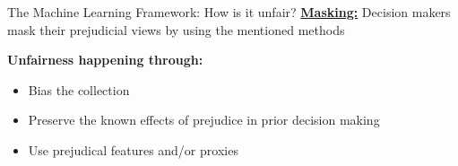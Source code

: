 \begin{frame}{The Machine Learning Framework: How is it unfair? \cite{Barocas.2016, barocas-hardt-narayanan}}
    \underline{\textbf{Masking:}} Decision makers mask their prejudicial views by using the mentioned methods \newline 
    
    \begin{block}{\textbf{Unfairness happening through:}}
    \begin{itemize}
        \item Bias the collection
        \item Preserve the known effects of prejudice in prior decision making
        \item Use prejudical features and/or proxies
    \end{itemize}
        \end{block}
\end{frame}